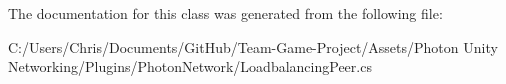 The documentation for this class was generated from the following file\+:\begin{DoxyCompactItemize}
\item 
C\+:/\+Users/\+Chris/\+Documents/\+Git\+Hub/\+Team-\/\+Game-\/\+Project/\+Assets/\+Photon Unity Networking/\+Plugins/\+Photon\+Network/Loadbalancing\+Peer.\+cs\end{DoxyCompactItemize}
